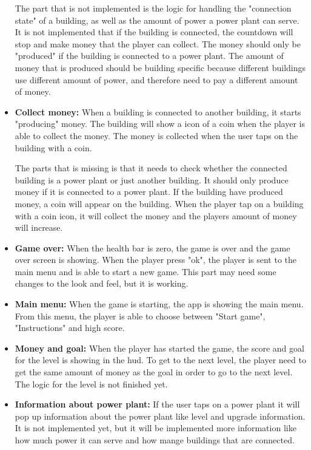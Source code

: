 \begin{itemize}
		The part that is not implemented is the logic for handling the "connection state" of a building, 
		as well as the amount of power a power plant can serve. It is not implemented that if the building
		is connected, the countdown will stop and make money that the player can collect. The money should
		only be "produced" if the building is connected to a power plant. The amount of money that is 
		produced should be building specific because different buildings use different amount of power, and
		therefore need to pay a different amount of money. 

		\item {\bf Collect money:} When a building is connected to another building, it starts 
		"producing" money. The building will show a icon of a coin when the player is able to 
		collect the money. The money is collected when the user taps on the building with a coin. 

		The parts that is missing is that it needs to check whether the connected building is a power plant 
		or just another building. It should only produce money if it is connected to a power plant. 
		If the building have produced money, a coin will appear on the building. When the player tap
		on a building with a coin icon, it will collect the money and the players amount of money 
		will increase. 

		\item {\bf Game over:} When the health bar is zero, the game is over and the game over screen 
		is showing. When the player press "ok", the player is sent to the main menu and is able to 
		start a new game. This part may need some changes to the look and feel, but it is working.

		\item {\bf Main menu:} When the game is starting, the app is showing the main menu. 
		From this menu, the player is able to choose between "Start game", "Instructions" and high score.

		\item {\bf Money and goal:} When the player has started the game, the score and goal for
		the level is showing in the hud. To get to the next level, the player need to get the same
		amount of money as the goal in order to go to the next level. The logic for the level
		is not finished yet.

		\item {\bf Information about power plant:} If the user taps on a power plant it will pop up
		information about the power plant like level and upgrade information. It is not implemented yet,
		but it will be implemented more information like how much power it can serve and how mange
		buildings that are connected. 


\end{itemize}

